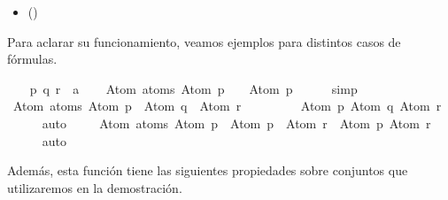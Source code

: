 \begin{isabellebody}
\begin{isamarkuptext}
  \begin{itemize}
    \item[]  \hfill ()
  \end{itemize}

  Para aclarar su funcionamiento, veamos ejemplos para distintos casos de fórmulas.%
\end{isamarkuptext}\isamarkuptrue%
\isamarkupfalse%
\isanewline
{}\isanewline
%
\isadelimproof
\ \ %
\endisadelimproof
%
\isatagproof
{}\isamarkupfalse%
\ p\ q\ r\ {\isacharcolon}{\isacharcolon}\ {\isacharprime}a\isanewline
\isanewline
\ \ \isamarkupfalse%
\ {\isachardoublequoteopen}Atom\ {\isacharbackquote}atoms\ {\isacharparenleft}Atom\ p\ \isactrlbold {\isasymor}\ {\isasymbottom}{\isacharparenright}\ {\isacharequal}\ {\isacharbraceleft}Atom\ p{\isacharbraceright}{\isachardoublequoteclose}\isanewline
\ \ \ \ \isamarkupfalse%
\ simp\isanewline
\isanewline
\ \ \isamarkupfalse%
\ {\isachardoublequoteopen}Atom\ {\isacharbackquote}atoms\ {\isacharparenleft}{\isacharparenleft}Atom\ p\ \isactrlbold {\isasymrightarrow}\ Atom\ q{\isacharparenright}\ \isactrlbold {\isasymor}\ Atom\ r{\isacharparenright}\ {\isacharequal}\ \isanewline
\ \ \ \ \ \ \ {\isacharbraceleft}Atom\ p{\isacharcomma}\ Atom\ q{\isacharcomma}\ Atom\ r{\isacharbraceright}{\isachardoublequoteclose}\isanewline
\ \ \ \ \isamarkupfalse%
\ auto\ \isanewline
\isanewline
\ \ \isamarkupfalse%
\ {\isachardoublequoteopen}Atom\ {\isacharbackquote}atoms\ {\isacharparenleft}{\isacharparenleft}Atom\ p\ \isactrlbold {\isasymrightarrow}\ Atom\ p{\isacharparenright}\ \isactrlbold {\isasymor}\ Atom\ r{\isacharparenright}\ {\isacharequal}\ {\isacharbraceleft}Atom\ p{\isacharcomma}\ Atom\ r{\isacharbraceright}{\isachardoublequoteclose}\isanewline
\ \ \ \ \isamarkupfalse%
\ auto%
\endisatagproof
{\isafoldproof}%
%
\isadelimproof
\isanewline
%
\endisadelimproof
{}\isamarkupfalse%
%
\begin{isamarkuptext}%
Además, esta función tiene las siguientes propiedades sobre conjuntos que utilizaremos
  en la demostración.


\end{isamarkuptext}
\end{isabellebody}
